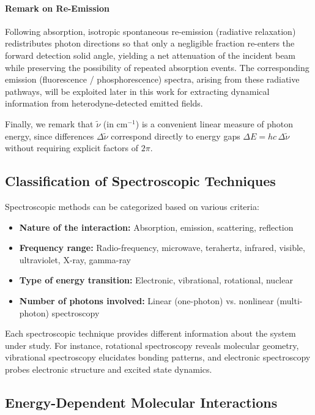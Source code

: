 \paragraph{Remark on Re-Emission}
\noindent Following absorption, isotropic spontaneous re-emission (radiative relaxation) redistributes photon directions so that only a negligible fraction re-enters the forward detection solid angle, yielding a net attenuation of the incident beam while preserving the possibility of repeated absorption events. The corresponding emission (fluorescence / phosphorescence) spectra, arising from these radiative pathways, will be exploited later in this work for extracting dynamical information from heterodyne-detected emitted fields.

\noindent Finally, we remark that $\tilde{\nu}$ (in cm$^{-1}$) is a convenient linear measure of photon energy, since differences $\Delta\tilde{\nu}$ correspond directly to energy gaps $\Delta E = h c\, \Delta\tilde{\nu}$ without requiring explicit factors of $2\pi$.


\subsection{Classification of Spectroscopic Techniques}
\label{subsec:spectroscopy_classification}

\noindent Spectroscopic methods can be categorized based on various criteria:

\begin{itemize}
    \item \textbf{Nature of the interaction:} Absorption, emission, scattering, reflection
    \item \textbf{Frequency range:} Radio-frequency, microwave, terahertz, infrared, visible, ultraviolet, X-ray, gamma-ray
    \item \textbf{Type of energy transition:} Electronic, vibrational, rotational, nuclear
    \item \textbf{Number of photons involved:} Linear (one-photon) vs. nonlinear (multi-photon) spectroscopy
\end{itemize}

\noindent Each spectroscopic technique provides different information about the system under study. For instance, rotational spectroscopy reveals molecular geometry, vibrational spectroscopy elucidates bonding patterns, and electronic spectroscopy probes electronic structure and excited state dynamics.

\subsection{Energy-Dependent Molecular Interactions}
\label{subsec:energy_dependent_interactions}

